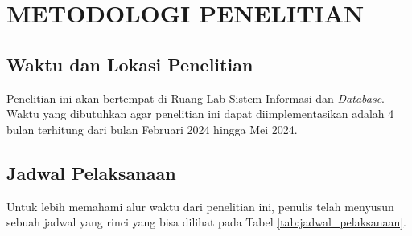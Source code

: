 
\chapter{METODOLOGI PENELITIAN}

\section{Waktu dan Lokasi Penelitian}
Penelitian ini akan bertempat di Ruang Lab Sistem Informasi dan \textit{Database}. Waktu yang dibutuhkan agar penelitian ini dapat diimplementasikan adalah 4 bulan terhitung dari bulan Februari 2024 hingga Mei 2024.

\section{Jadwal Pelaksanaan}

\par Untuk lebih memahami alur waktu dari penelitian ini, penulis telah menyusun sebuah jadwal yang rinci yang bisa dilihat pada Tabel \ref{tab:jadwal_pelaksanaan}.




